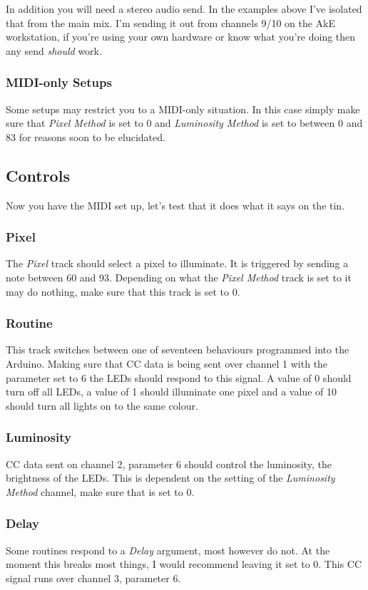 \documentclass{article}
\begin{document}
	In addition you will need a stereo audio send. In the examples above I've 
	isolated that from the main mix. I'm sending it out from channels 9/10 on 
	the AkE workstation, if you're using your own hardware or know what you're 
	doing then any send \emph{should} work.

	\subsubsection{MIDI-only Setups}
	Some setups may restrict you to a MIDI-only situation. In this case simply 
	make sure that \emph{Pixel Method} is set to 0 and \emph{Luminosity Method} 
	is set to between 0 and 83 for reasons soon to be elucidated.

	\subsection{Controls}
	Now you have the MIDI set up, let's test that it does what it says on the 
	tin.

	\subsubsection{Pixel}
	The \emph{Pixel} track should select a pixel to illuminate. It is triggered 
	by sending a note between 60 and 93. Depending on what the 
	\emph{Pixel Method} track is set to it may do nothing, make sure that this 
	track is set to 0.

	\subsubsection{Routine}
	This track switches between one of seventeen behaviours programmed into the 
	Arduino. Making sure that CC data is being sent over channel 1 with the 
	parameter set to 6 the LEDs should respond to this signal. A value of 0 
	should turn off all LEDs, a value of 1 should illuminate one pixel and a 
	value of 10 should turn all lights on to the same colour.

	\subsubsection{Luminosity}
	CC data sent on channel 2, parameter 6 should control the luminosity, the 
	brightness of the LEDs. This is dependent on the setting of the 
	\emph{Luminosity Method} channel, make sure that is set to 0.

	\subsubsection{Delay}
	Some routines respond to a \emph{Delay} argument, most however do not. At 
	the moment this breaks most things, I would recommend leaving it set to 0. 
	This CC signal runs over channel 3, parameter 6.
\end{document}
